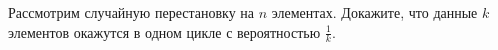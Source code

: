 \documentclass{article}
\begin{document}
Рассмотрим случайную перестановку на $n$ элементах. Докажите, что данные $k$ элементов окажутся в одном цикле с вероятностью $\frac1k$.
\end{document}
